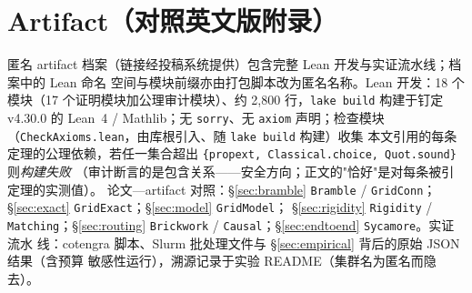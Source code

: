 \documentclass[11pt]{ctexart}
\begin{document}
\appendix
\section{Artifact（对照英文版附录）}\label{app:artifact}

匿名 artifact 档案（链接经投稿系统提供）包含完整 Lean 开发与实证流水线；档案中的 Lean 命名
空间与模块前缀亦由打包脚本改为匿名名称。Lean 开发：18 个
模块（17 个证明模块加公理审计模块）、约 2{,}800 行，\texttt{lake build} 构建于钉定
v4.30.0 的 Lean~4 / Mathlib；无
\texttt{sorry}、无 \texttt{axiom} 声明；检查模块
（\texttt{CheckAxioms.lean}，由库根引入、随 \texttt{lake build} 构建）收集
本文引用的每条定理的公理依赖，若任一集合超出
\texttt{\{propext, Classical.choice, Quot.sound\}} 则\emph{构建失败}
（审计断言的是包含关系——安全方向；正文的"恰好"是对每条被引定理的实测值）。
论文—artifact 对照：\S\ref{sec:bramble} \texttt{Bramble} / \texttt{GridConn}；
\S\ref{sec:exact} \texttt{GridExact}；\S\ref{sec:model} \texttt{GridModel}；
\S\ref{sec:rigidity} \texttt{Rigidity} / \texttt{Matching}；\S\ref{sec:routing}
\texttt{Brickwork} / \texttt{Causal}；\S\ref{sec:endtoend} \texttt{Sycamore}。实证流水
线：cotengra 脚本、Slurm 批处理文件与 \S\ref{sec:empirical} 背后的原始 JSON 结果（含预算
敏感性运行），溯源记录于实验 README（集群名为匿名而隐去）。



\end{document}
